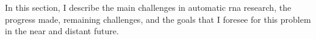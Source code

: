 

In this section, I describe the main challenges in automatic
\gls{rna} research, the progress made,
remaining challenges, and the goals that I foresee for this
problem in the near and distant future.
